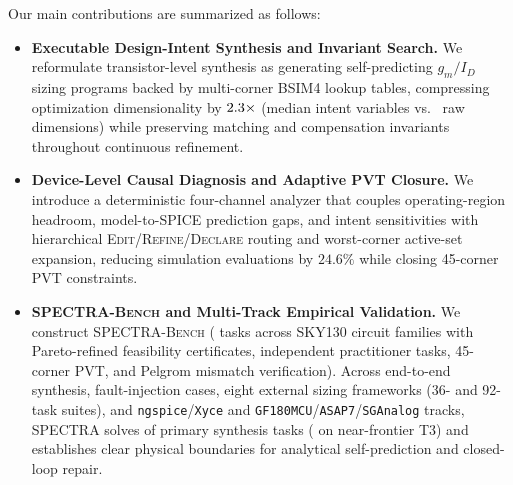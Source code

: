 Our main contributions are summarized as follows:
\begin{itemize}[leftmargin=*, topsep=2pt, itemsep=1.5pt]
\item \textbf{Executable Design-Intent Synthesis and Invariant Search.} We reformulate transistor-level synthesis as generating self-predicting $g_m/I_D$ sizing programs backed by multi-corner BSIM4 lookup tables, compressing optimization dimensionality by $2.3{}\times$ (median \IntentVars{} intent variables vs.\ \RawVars{} raw dimensions) while preserving matching and compensation invariants throughout continuous refinement.
\item \textbf{Device-Level Causal Diagnosis and Adaptive PVT Closure.} We introduce a deterministic four-channel analyzer that couples operating-region headroom, model-to-SPICE prediction gaps, and intent sensitivities with hierarchical \textsc{Edit}/\textsc{Refine}/\textsc{Declare} routing and worst-corner active-set expansion, reducing simulation evaluations by $24.6\%$ while closing 45-corner PVT constraints.
\item \textbf{\textsc{SPECTRA-Bench} and Multi-Track Empirical Validation.} We construct \textsc{SPECTRA-Bench} (\NTasksTotal{} tasks across \NPrimaryFamilies{} SKY130 circuit families with Pareto-refined feasibility certificates, \NDesigner{} independent practitioner tasks, 45-corner PVT, and Pelgrom mismatch verification). Across end-to-end synthesis, \FaultN{} fault-injection cases, eight external sizing frameworks (36- and 92-task suites), and \texttt{ngspice}/\texttt{Xyce} and \texttt{GF180MCU}/\texttt{ASAP7}/\texttt{SGAnalog} tracks, \textsc{SPECTRA} solves \SpectraPrim{} of primary synthesis tasks (\SpectraTThree{} on near-frontier T3) and establishes clear physical boundaries for analytical self-prediction and closed-loop repair.
\end{itemize}
